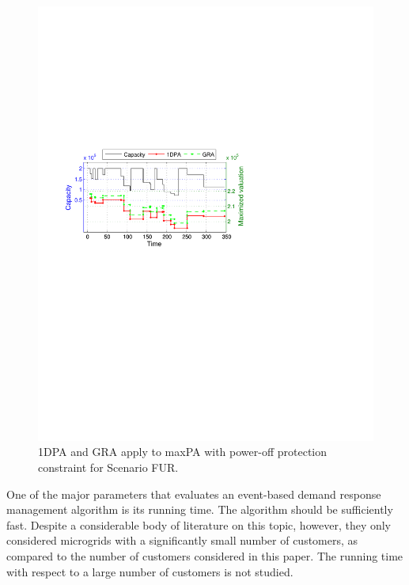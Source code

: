 \begin{figure}[!htb]\vspace{-5pt}
	\begin{center}
		\includegraphics[scale=0.6]{fig/maxpatac.pdf}
	\end{center}\vspace{-5pt}
\caption{{\sc 1DPA} and {\sc GRA} apply to {\sc maxPA} with power-off protection constraint for Scenario FUR.}
	\label{fig:maxpatac}
\end{figure}

One of the major parameters that evaluates an event-based demand response management algorithm is its running time. The algorithm should be sufficiently fast. Despite a considerable body of literature on this topic, however, they only considered microgrids with a significantly small number of customers, as compared to the number of customers considered in this paper. The running time with respect to a large number of customers is not studied.

